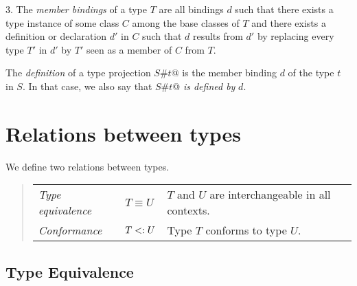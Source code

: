 \documentclass[a4paper,12pt,twoside,titlepage]{book}
\begin{document}
3. The {\em member bindings} of a type $T$ are all bindings $d$ such that
there exists a type instance of some class $C$ among the base classes of $T$
and there exists a definition or declaration $d'$ in $C$
such that $d$ results from $d'$ by replacing every
type $T'$ in $d'$ by $T'$ seen as a member of $C$ from $T$.

The {\em definition} of a type projection \lstinline@$S$#$t$@ is the member
binding $d$ of the type $t$ in $S$. In that case, we also say
that \lstinline@$S$#$t$@ {\em is defined by} $d$.

\section{Relations between types}

We define two relations between types.
\begin{quote}\begin{tabular}{l@{\gap}l@{\gap}l}
\em Type equivalence & $T \equiv U$ & $T$ and $U$ are interchangeable
in all contexts.
\\
\em Conformance & $T <: U$ & Type $T$ conforms to type $U$.
\end{tabular}\end{quote}

\subsection{Type Equivalence}
\label{sec:type-equiv}
\end{document}

